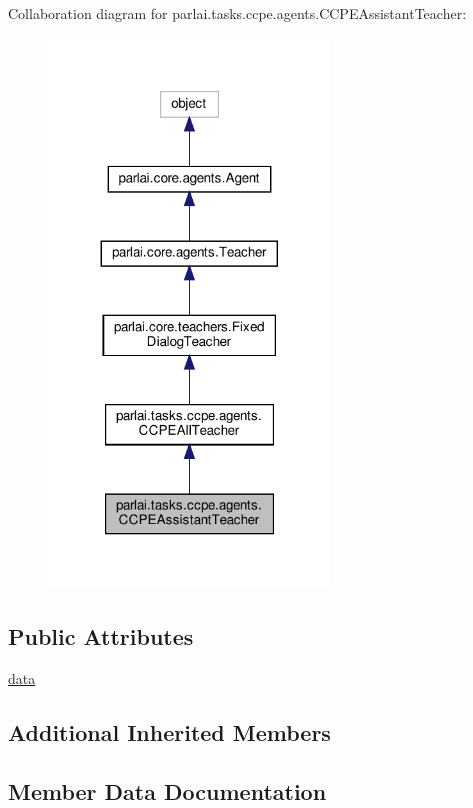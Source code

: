 Collaboration diagram for parlai.\+tasks.\+ccpe.\+agents.\+C\+C\+P\+E\+Assistant\+Teacher\+:
\nopagebreak
\begin{figure}[H]
\begin{center}
\leavevmode
\includegraphics[width=212pt]{classparlai_1_1tasks_1_1ccpe_1_1agents_1_1CCPEAssistantTeacher__coll__graph}
\end{center}
\end{figure}
\subsection*{Public Attributes}
\begin{DoxyCompactItemize}
\item 
\hyperlink{classparlai_1_1tasks_1_1ccpe_1_1agents_1_1CCPEAssistantTeacher_aeb95d397c64b27bdd7d99270a86ca190}{data}
\end{DoxyCompactItemize}
\subsection*{Additional Inherited Members}


\subsection{Member Data Documentation}
\mbox{\label{classparlai_1_1tasks_1_1ccpe_1_1agents_1_1CCPEAssistantTeacher_aeb95d397c64b27bdd7d99270a86ca190}} 
